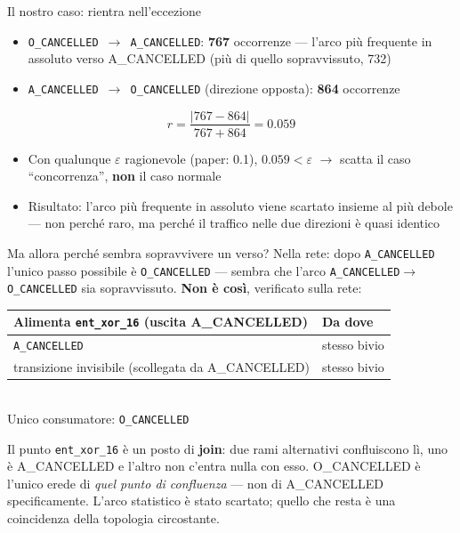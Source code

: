 \documentclass[11pt,aspectratio=169]{beamer}
\begin{document}
\begin{frame}{Il nostro caso: rientra nell'eccezione}
\begin{itemize}
\item \texttt{O\_CANCELLED $\to$ A\_CANCELLED}: \textbf{767} occorrenze --- l'arco pi\`u frequente in assoluto verso A\_CANCELLED (pi\`u di quello sopravvissuto, 732)
\item \texttt{A\_CANCELLED $\to$ O\_CANCELLED} (direzione opposta): \textbf{864} occorrenze
\end{itemize}
\[
r = \frac{|767-864|}{767+864} = \mathbf{0.059}
\]
\begin{itemize}
\item Con qualunque $\varepsilon$ ragionevole (paper: 0.1), $0.059 < \varepsilon$ $\to$ scatta il caso ``concorrenza'', \textbf{non} il caso normale
\item Risultato: l'arco pi\`u frequente in assoluto viene scartato insieme al pi\`u debole --- non perch\'e raro, ma perch\'e il traffico nelle due direzioni \`e quasi identico
\end{itemize}
\end{frame}

\begin{frame}{Ma allora perch\'e sembra sopravvivere un verso?}
Nella rete: dopo \texttt{A\_CANCELLED} l'unico passo possibile \`e \texttt{O\_CANCELLED} --- sembra che l'arco \texttt{A\_CANCELLED$\to$O\_CANCELLED} sia sopravvissuto. \textbf{Non \`e cos\`i}, verificato sulla rete:
\begin{center}
\small
\begin{tabular}{ll}
\toprule
\textbf{Alimenta \texttt{ent\_xor\_16}} (uscita A\_CANCELLED) & \textbf{Da dove} \\
\midrule
\texttt{A\_CANCELLED} & stesso bivio \\
transizione invisibile (scollegata da A\_CANCELLED) & stesso bivio \\
\bottomrule
\end{tabular}\\[4pt]
Unico consumatore: \texttt{O\_CANCELLED}
\end{center}
\begin{alertblock}{Il punto}
\texttt{ent\_xor\_16} \`e un posto di \textbf{join}: due rami alternativi confluiscono l\`i, uno \`e A\_CANCELLED e l'altro non c'entra nulla con esso. O\_CANCELLED \`e l'unico erede di \emph{quel punto di confluenza} --- non di A\_CANCELLED specificamente. L'arco statistico \`e stato scartato; quello che resta \`e una coincidenza della topologia circostante.
\end{alertblock}
\end{frame}
\end{document}
